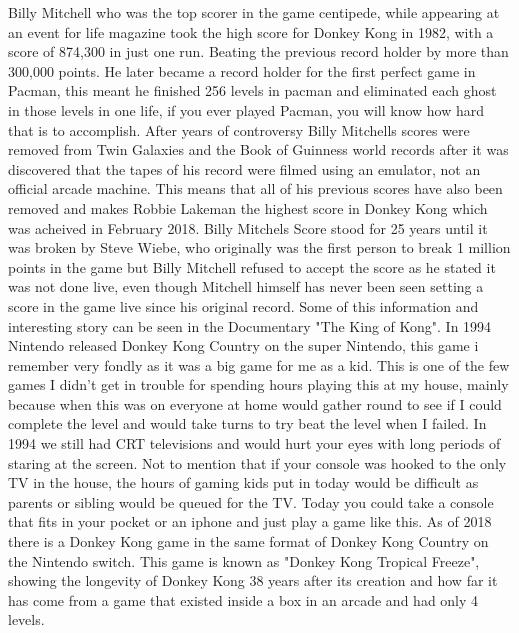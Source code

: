 \documentclass{article}
\begin{document}
 Billy Mitchell who was the top scorer in the game centipede, while appearing at an event for life magazine took the high score for Donkey Kong in 1982, with a score of 874,300 in just one run. Beating the previous record holder by more than 300,000 points. He later became a record holder for the first perfect game in Pacman, this meant he finished 256 levels in pacman and eliminated each ghost in those levels in one life, if you ever played Pacman, you will know how hard that is to accomplish. \newline \newline
After years of controversy Billy Mitchells scores were removed from Twin Galaxies and the Book of Guinness world records after it was discovered that the tapes of his record were filmed using an emulator, not an official arcade machine. This means that all of his previous scores have also been removed and makes Robbie Lakeman the highest score in Donkey Kong which was acheived in February 2018. Billy Mitchels Score stood for 25 years until it was broken by Steve Wiebe, who originally was the first person to break 1 million points in the game but Billy Mitchell refused to accept the score as he stated it was not done live, even though Mitchell himself has never been seen setting a score in the game live since his original record. Some of this information and interesting story can be seen in the Documentary "The King of Kong". \newline \newline
In 1994 Nintendo released Donkey Kong Country on the super Nintendo, this game i remember very fondly as it was a big game for me as a kid. This is one of the few games I didn't get in trouble for spending hours playing this at my house, mainly because when this was on everyone at home would gather round to see if I could complete the level and would take turns to try beat the level when I failed. In 1994 we still had CRT televisions and would hurt your eyes with long periods of staring at the screen. Not to mention that if your console was hooked to the only TV in the house, the hours of gaming kids put in today would be difficult as parents or sibling would be queued for the TV. Today you could take a console that fits in your pocket or an iphone and just play a game like this. As of 2018 there is a Donkey Kong game in the same format of Donkey Kong Country on the Nintendo switch. This game is known as "Donkey Kong Tropical Freeze", showing the longevity of Donkey Kong 38 years after its creation and how far it has come from a game that existed inside a box in an arcade and had only 4 levels.
\clearpage
\end{document}
